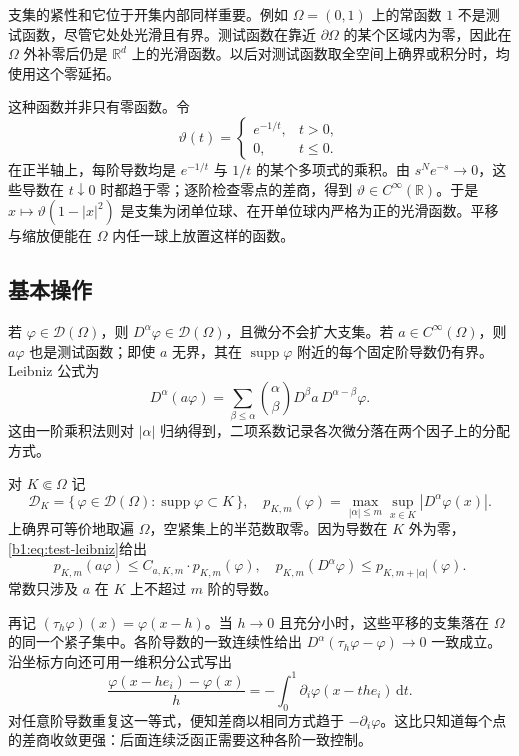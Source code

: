 \ProseParagraphBreak

支集的紧性和它位于开集内部同样重要。例如 \(\Omega=(0,1)\) 上的常函数 \(1\) 不是测试函数，尽管它处处光滑且有界。测试函数在靠近 \(\partial\Omega\) 的某个区域内为零，因此在 \(\Omega\) 外补零后仍是 \(\mathbb R^d\) 上的光滑函数。以后对测试函数取全空间上确界或积分时，均使用这个零延拓。

\ProseParagraphBreak

这种函数并非只有零函数。令
\[
 \vartheta(t)=
 \begin{cases}e^{-1/t},&t>0,\\0,&t\leq0.\end{cases}
\]
在正半轴上，每阶导数均是 \(e^{-1/t}\) 与 \(1/t\) 的某个多项式的乘积。由 \(s^Ne^{-s}\to0\)，这些导数在 \(t\downarrow0\) 时都趋于零；逐阶检查零点的差商，得到 \(\vartheta\in C^\infty(\mathbb R)\)。于是 \(x\mapsto\vartheta(1-|x|^2)\) 是支集为闭单位球、在开单位球内严格为正的光滑函数。平移与缩放便能在 \(\Omega\) 内任一球上放置这样的函数。

\subsection{基本操作}
\label{b1:subsec:200102}

若 \(\varphi\in\mathcal D(\Omega)\)，则 \(D^\alpha\varphi\in\mathcal D(\Omega)\)，且微分不会扩大支集。若 \(a\in C^\infty(\Omega)\)，则 \(a\varphi\) 也是测试函数；即使 \(a\) 无界，其在 \(\operatorname{supp}\varphi\) 附近的每个固定阶导数仍有界。Leibniz 公式为
\begin{equation}\label{b1:eq:test-leibniz}
 D^\alpha(a\varphi)
 =\sum_{\beta\leq\alpha}\binom\alpha\beta
 D^\beta a\,D^{\alpha-\beta}\varphi.
\end{equation}
这由一阶乘积法则对 \(|\alpha|\) 归纳得到，二项系数记录各次微分落在两个因子上的分配方式。

\ProseParagraphBreak

对 \(K\Subset\Omega\) 记
\[
 \mathcal D_K=\{\,\varphi\in\mathcal D(\Omega):\operatorname{supp}\varphi\subset K\,\},
 \quad p_{K,m}(\varphi)=\max_{|\alpha|\leq m}\sup_{x\in K}|D^\alpha\varphi(x)|.
\]
上确界可等价地取遍 \(\Omega\)，空紧集上的半范数取零。因为导数在 \(K\) 外为零，\eqref{b1:eq:test-leibniz}给出
\[
 p_{K,m}(a\varphi)\leq C_{a,K,m}\cdot p_{K,m}(\varphi),
 \quad p_{K,m}(D^\alpha\varphi)\leq p_{K,m+|\alpha|}(\varphi).
\]
常数只涉及 \(a\) 在 \(K\) 上不超过 \(m\) 阶的导数。

\ProseParagraphBreak

再记 \((\tau_h\varphi)(x)=\varphi(x-h)\)。当 \(h\to0\) 且充分小时，这些平移的支集落在 \(\Omega\) 的同一个紧子集中。各阶导数的一致连续性给出 \(D^\alpha(\tau_h\varphi-\varphi)\to0\) 一致成立。沿坐标方向还可用一维积分公式写出
\[
 \frac{\varphi(x-he_i)-\varphi(x)}h
 =-\int_0^1\partial_i\varphi(x-the_i)\,\mathrm dt.
\]
对任意阶导数重复这一等式，便知差商以相同方式趋于 \(-\partial_i\varphi\)。这比只知道每个点的差商收敛更强：后面连续泛函正需要这种各阶一致控制。

